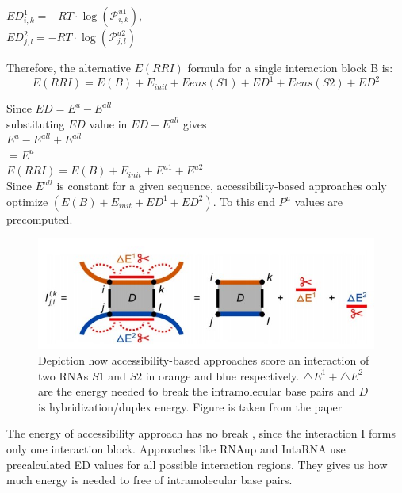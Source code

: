 \documentclass[twoside,a4paper]{report}
\begin{document}
	\begin{center}
	$ED^{1}_{i,k} = - RT \cdot \log(\mathcal{P}^{u1}_{i,k})$,\\ 
	$ED^{2}_{j,l} =  - RT \cdot \log(\mathcal{P}^{u2}_{j,l})$\\
	\end{center}

	
	Therefore, the alternative $E(RRI)$ formula for a single interaction block B is:\\
	\begin{equation}
	E(RRI) = E(B) + E_{init} + Eens(S1) + ED^1 + Eens(S2) + ED^2
	\end{equation} 
	
 	Since $ED = E^u - E ^{all}$ \\
	substituting $ED$ value in  $ED + E^{all}$ gives\\
	 $E^u - E ^{all}+ E^{all}$ \\
	 $ = E^{u}$\\
	 $E(RRI) = E(B) + E_{init} + E^{u1} + E^{u2} $\\
	
	Since $E ^{all}$ is constant for a given sequence, accessibility-based approaches only optimize $(E(B) + E_{init} + ED^1 +ED^2)$. To this end $P^u$ values are precomputed.\\
	
	\begin{figure}[tb]
		\includegraphics[width=0.9\linewidth]{access}
		\centering
		\caption{ Depiction how accessibility-based approaches score an interaction of two RNAs $S1$ and $S2$ in orange and blue respectively. $\triangle E^1 + \triangle E^2$ are the energy needed to break the intramolecular base pairs and $D$ is hybridization/duplex energy. Figure is taken from the paper \citep{raden2018interactive}} 
		\label{fig:access}
	\end{figure}
	

	The energy of accessibility approach has no break , since the interaction I forms only one interaction block. Approaches like RNAup and IntaRNA use precalculated ED values for all possible interaction regions. They gives us how much energy is needed to free of intramolecular base pairs. \\
	
\end{document}

